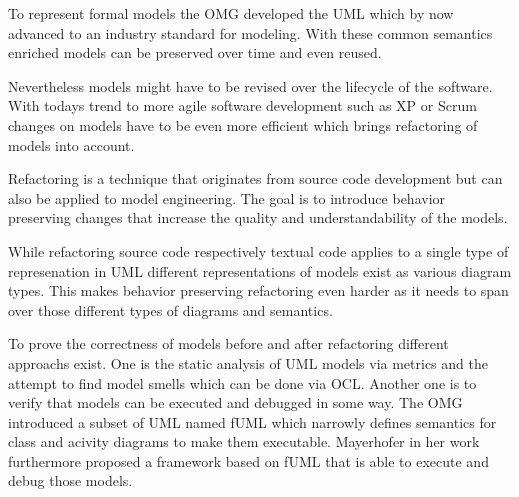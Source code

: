 \documentclass{llncs}
\begin{document}

To represent formal models the OMG developed the UML which by now advanced to an industry standard for modeling. With
these common semantics enriched models can be preserved over time and even reused.


Nevertheless models might have to be revised over the lifecycle of the software. With todays trend to more agile
software development such as XP or Scrum changes on models have to be even more efficient which brings refactoring of
models into account.


Refactoring is a technique that originates from source code development but can also be applied to model engineering.
The goal is to introduce behavior preserving changes \cite{mast:REFOOF} that increase the quality and understandability
of the models.


While refactoring source code respectively textual code applies to a single type of represenation in UML different
representations of models exist as various diagram types. This makes behavior preserving refactoring even harder as it
needs to span over those different types of diagrams and semantics.


To prove the correctness of models before and after refactoring different approachs exist. One is the static analysis of
UML models via metrics and the attempt to find model smells \cite{DBLP:conf/models/ArendtTW13} which can be done via
OCL. Another one is to verify that models can be executed and debugged in some way. The OMG introduced a subset of UML
named fUML which narrowly defines semantics for class and acivity diagrams to make them executable. Mayerhofer
\cite{DBLP:conf/icse/Mayerhofer12} in her work furthermore proposed a framework based on fUML that is able to execute
and debug those models.

\end{document}
